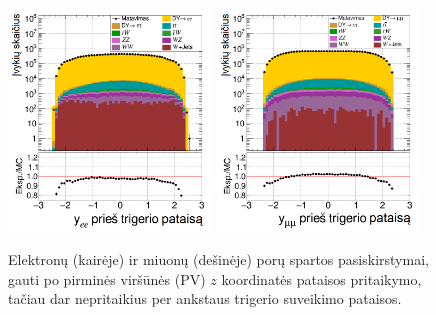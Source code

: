 \documentclass[a4paper, 12pt, oneside]{article}
\begin{document}
\begin{figure}[H]
	\includegraphics[width=0.48\textwidth]{ee_rapi_beforeL1.png}
	\includegraphics[width=0.48\textwidth]{mumu_rapi_beforeL1.png}
	\caption{\label{fig:rapibL1} Elektronų (kairėje) ir miuonų (dešinėje) porų spartos pasiskirstymai,
		gauti po pirminės viršūnės (PV) $z$ koordinatės pataisos pritaikymo, tačiau dar nepritaikius per ankstaus
		trigerio suveikimo pataisos.}
\end{figure}
\end{document}
